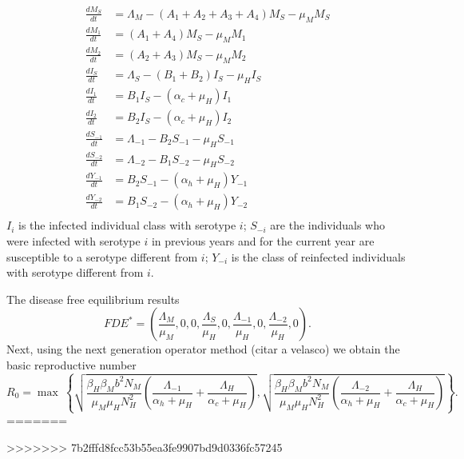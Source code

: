 \begin{equation}
\begin{aligned}
	\frac{dM_S}{dt}&= 
		\Lambda_M
		-(A_1 + A_2 + A_3 + A_4) M_S
		-\mu_M M_S
	\\
	\frac{dM_1}{dt}&=
		(A_1+A_4)M_S - \mu_M M_1
	\\
	\frac{dM_2}{dt}&=
		(A_2+A_3)M_S-\mu_MM_2
	\\
	\frac{dI_S}{dt}&=
		\Lambda_S - (B_1 + B_2)I_S
		-\mu_HI_S
	\\
	\frac{dI_1}{dt}&=
		B_1 I_S
		-(\alpha_c + \mu_H) I_1
	\\
	\frac{dI_2}{dt}&=
		B_2 I_S 
		-(\alpha_c + \mu_H)I_2
	\\
	\frac{dS_{-1}}{dt}&=
		\Lambda_{-1}-B_2S_{-1}-\mu_HS_{-1}
	\\
	\frac{dS_{-2}}{dt}&=
		\Lambda_{-2}-B_1S_{-2}-\mu_HS_{-2}
	\\
	\frac{dY_{-1}}{dt}&=
		B_2S_{-1}
		-(\alpha_h + \mu_H)Y_{-1}
	\\
	\frac{dY_{-2}}{dt}&=
		B_1 S_{-2} 
		- (\alpha_h + \mu_H) Y_{-2}
	\\
\end{aligned}
\end{equation}
%
%
$I_i$ is the infected individual class with serotype $i$; $S_{-i}$ are the 
individuals who were infected with serotype $i$ in previous years and for the 
current year are susceptible to a serotype different from $i$; $Y_{-i}$ is the 
class of reinfected individuals with serotype different from $i$.

	The disease free equilibrium results
$$
	FDE^*=
	\left(
		\frac{\Lambda_M}{\mu_M},
		0,
		0,
		\frac{\Lambda_S}{\mu_H},
		0,
		\frac{\Lambda_{-1}}{\mu_H},
		0,
		\frac{\Lambda_{-2}}{\mu_H},
		0
	\right).
$$
Next, using the next generation operator method (citar a velasco) we obtain
the basic reproductive number
%
\begin{equation}
	R_0=
	\max\
	\left\{ 
		\sqrt{
			\frac{\beta_H\beta_Mb^2N_M}{\mu_M\mu_HN_H^2}
			\left(
				\frac{\Lambda_{-1}}{\alpha_h+\mu_H}
				+
				\frac{\Lambda_H}{\alpha_c+\mu_H} 
			\right)
		},
		\sqrt{
			\frac{\beta_H\beta_Mb^2N_M}{\mu_M\mu_HN_H^2}
			\left(
				\frac{\Lambda_{-2}}{\alpha_h+\mu_H}
				+
				\frac{\Lambda_H}{\alpha_c+\mu_H}
			\right)
		}
	\right\}.
\end{equation}
%
=======



>>>>>>> 7b2fffd8fcc53b55ea3fe9907bd9d0336fc57245
